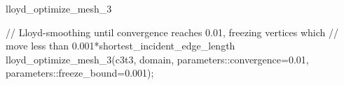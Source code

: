 \begin{ccRefFunction}{lloyd_optimize_mesh_3}
\ccExample 

\begin{ccExampleCode}
// Lloyd-smoothing until convergence reaches 0.01, freezing vertices which
// move less than 0.001*shortest_incident_edge_length
lloyd_optimize_mesh_3(c3t3, domain, parameters::convergence=0.01,
                      parameters::freeze_bound=0.001);
\end{ccExampleCode}

\ccSeeAlso

 \\
 \\
 \\
 \\
 \\

\end{ccRefFunction}

\ccRefPageEnd


